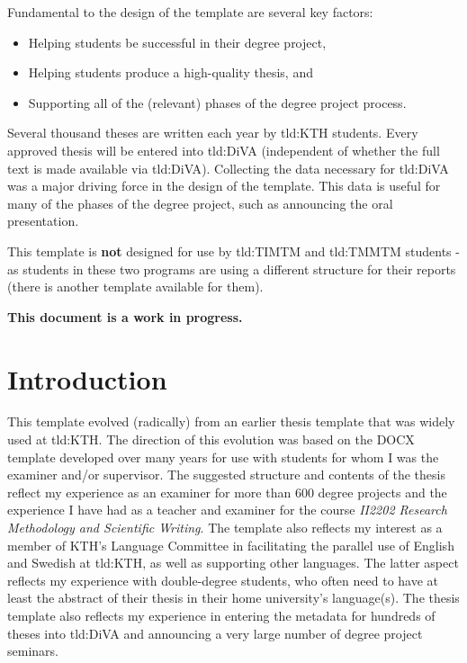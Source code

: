 Fundamental to the design of the template are several key factors:
\begin{itemize}
    \item Helping students be successful in their degree project,
    \item Helping students produce a high-quality thesis, and
    \item Supporting all of the (relevant) phases of the degree project process.
\end{itemize}

Several thousand theses are written each year by \gls{tld:KTH} students. Every approved thesis will be entered into \gls{tld:DiVA} (independent of whether the full text is made available via \gls{tld:DiVA}). Collecting the data necessary for \gls{tld:DiVA} was a major driving force in the design of the template. This data is useful for many of the phases of the degree project, such as announcing the oral presentation.
    
This template is \textbf{not} designed for use by \gls{tld:TIMTM} and \gls{tld:TMMTM} students - as students in these two programs are using a different structure for their reports (there is another template available for them).

\textbf{This document is a work in progress.}

\section{Introduction}
This template evolved (radically) from an earlier thesis template that was widely used at \gls{tld:KTH}. The direction of this evolution was based on the DOCX template developed over many years for use with students for whom I was the examiner and/or supervisor. The suggested structure and contents of the thesis reflect my experience as an examiner for more than 600 degree projects and the experience I have had as a teacher and examiner for the course \textit{II2202 Research Methodology and Scientific Writing}. The template also reflects my interest as a member of KTH's Language Committee in facilitating the parallel use of English and Swedish at \gls{tld:KTH}, as well as supporting other languages. The latter aspect
reflects my experience with double-degree students, who often need to have at least the abstract of their thesis in their home university's language(s). The thesis template also reflects
my experience in entering the metadata for hundreds of theses into \gls{tld:DiVA} and announcing a very large number of degree project seminars.

